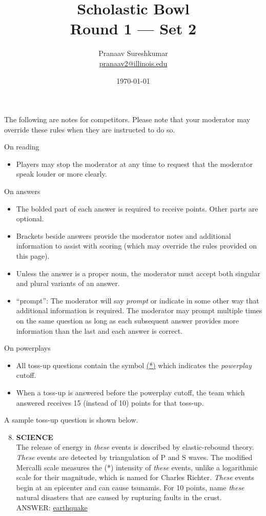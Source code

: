 \documentclass{report}
\title{\textbf{Scholastic Bowl} \\ Round 1 --- Set 2}
\author{Pranaav Sureshkumar \\ \href{mailto:pranaav2@illinois.edu}{pranaav2@illinois.edu}}
\date{\today}
\begin{document}
\thispagestyle{empty}
The following are notes for competitors. Please note that your moderator may override these rules when they are instructed to do so.

\vspace*{0.3 cm}
On reading
\begin{itemize}
    \item Players may stop the moderator at any time to request that the moderator speak louder or more clearly.
\end{itemize}

\vspace*{0.3 cm}
On answers
\begin{itemize}
    \item The bolded part of each answer is required to receive points. Other parts are optional.
    \item Brackets beside answers provide the moderator notes and additional information to assist with scoring (which may override the rules provided on this page).
    \item Unless the answer is a proper noun, the moderator must accept both singular and plural variants of an answer. 
    \item ``prompt'': The moderator will say \textit{prompt} or indicate in some other way that additional information is required. The moderator may prompt multiple times on the same question as long as each subsequent answer provides more information than the last and each answer is correct.
\end{itemize}

\vspace*{0.3 cm}
On powerplays
\begin{itemize}
    \item All toss-up questions contain the symbol \underline{(*)} which indicates the \textit{powerplay} cutoff.
    \item When a toss-up is answered before the powerplay cutoff, the team which answered receives 15 (instead of 10) points for that toss-up.
\end{itemize}

\vspace*{0.3 cm}
A sample toss-up question is shown below.

\begin{mdframed}[style=sample]
    \begin{enumerate}
        \setcounter{enumi}{7}
        \item \textbf{SCIENCE} \\ The release of energy in \textit{these} events is described by elastic-rebound theory. \textit{These} events are detected by triangulation of P and S waves. The modified Mercalli scale measures the (*) intensity of \textit{these} events, unlike a logarithmic scale for their magnitude, which is named for Charles Richter. \textit{These} events begin at an epicenter and can cause tsunamis. For 10 points, name \textit{these} natural disasters that are caused by rupturing faults in the crust. \\ ANSWER: \underline{earthquake}
    \end{enumerate}
    \end{mdframed}
\end{document}
